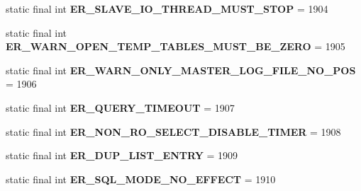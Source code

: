 \begin{DoxyCompactItemize}
static final int {\bfseries E\+R\+\_\+\+S\+L\+A\+V\+E\+\_\+\+I\+O\+\_\+\+T\+H\+R\+E\+A\+D\+\_\+\+M\+U\+S\+T\+\_\+\+S\+T\+OP} = 1904
\item 
\mbox{\label{classcom_1_1mysql_1_1cj_1_1exceptions_1_1_mysql_error_numbers_a544254efdba1c65a409b181e6f0b8e6d}} 
static final int {\bfseries E\+R\+\_\+\+W\+A\+R\+N\+\_\+\+O\+P\+E\+N\+\_\+\+T\+E\+M\+P\+\_\+\+T\+A\+B\+L\+E\+S\+\_\+\+M\+U\+S\+T\+\_\+\+B\+E\+\_\+\+Z\+E\+RO} = 1905
\item 
\mbox{\label{classcom_1_1mysql_1_1cj_1_1exceptions_1_1_mysql_error_numbers_a96f726df5820984cdc0482702f0c5b71}} 
static final int {\bfseries E\+R\+\_\+\+W\+A\+R\+N\+\_\+\+O\+N\+L\+Y\+\_\+\+M\+A\+S\+T\+E\+R\+\_\+\+L\+O\+G\+\_\+\+F\+I\+L\+E\+\_\+\+N\+O\+\_\+\+P\+OS} = 1906
\item 
\mbox{\label{classcom_1_1mysql_1_1cj_1_1exceptions_1_1_mysql_error_numbers_ac3bab76be9033488fe1330df0c0ad45a}} 
static final int {\bfseries E\+R\+\_\+\+Q\+U\+E\+R\+Y\+\_\+\+T\+I\+M\+E\+O\+UT} = 1907
\item 
\mbox{\label{classcom_1_1mysql_1_1cj_1_1exceptions_1_1_mysql_error_numbers_ae658edee08864195261bc78e7bb260c0}} 
static final int {\bfseries E\+R\+\_\+\+N\+O\+N\+\_\+\+R\+O\+\_\+\+S\+E\+L\+E\+C\+T\+\_\+\+D\+I\+S\+A\+B\+L\+E\+\_\+\+T\+I\+M\+ER} = 1908
\item 
\mbox{\label{classcom_1_1mysql_1_1cj_1_1exceptions_1_1_mysql_error_numbers_ac56ebabb62cbecbc6e22b1bc23161a3a}} 
static final int {\bfseries E\+R\+\_\+\+D\+U\+P\+\_\+\+L\+I\+S\+T\+\_\+\+E\+N\+T\+RY} = 1909
\item 
\mbox{\label{classcom_1_1mysql_1_1cj_1_1exceptions_1_1_mysql_error_numbers_a16d411b4ee15e8bf983f211ec5ef3211}} 
static final int {\bfseries E\+R\+\_\+\+S\+Q\+L\+\_\+\+M\+O\+D\+E\+\_\+\+N\+O\+\_\+\+E\+F\+F\+E\+CT} = 1910
\item 
\mbox{\label{classcom_1_1mysql_1_1cj_1_1exceptions_1_1_mysql_error_numbers_a40840bbfa0c16f1d6a94424e3cb483ab}} 

\end{DoxyCompactItemize}
